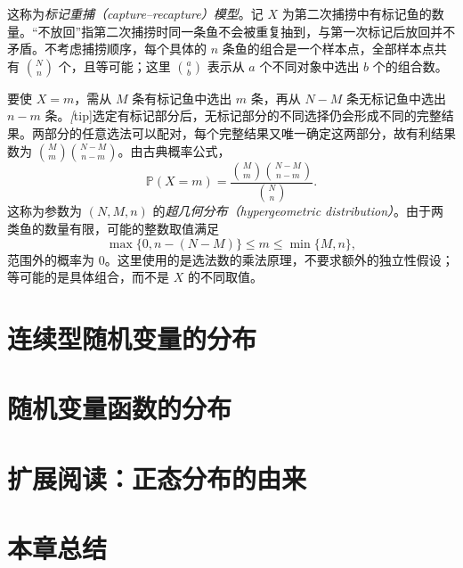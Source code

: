 \documentclass[UTF8,12pt,a4paper,fontset=fandol]{ctexbook}
\begin{document}
\begin{solve}
这称为\emph{标记重捕（capture--recapture）模型}。记 $X$ 为第二次捕捞中有标记鱼的数量。“不放回”指第二次捕捞时同一条鱼不会被重复抽到，与第一次标记后放回并不矛盾。不考虑捕捞顺序，每个具体的 $n$ 条鱼的组合是一个样本点，全部样本点共有 $\binom Nn$ 个，且等可能；这里 $\binom ab$ 表示从 $a$ 个不同对象中选出 $b$ 个的组合数。

要使 $X=m$，需从 $M$ 条有标记鱼中选出 $m$ 条，再从 $N-M$ 条无标记鱼中选出 $n-m$ 条。\emph[tip]{选定有标记部分后，无标记部分的不同选择仍会形成不同的完整结果。}两部分的任意选法可以配对，每个完整结果又唯一确定这两部分，故有利结果数为 $\binom Mm\binom{N-M}{n-m}$。由古典概率公式，
\begin{equation}
  \mathbb P(X=m)=\frac{\binom Mm\binom{N-M}{n-m}}{\binom Nn}.
  \label{eq:study-hypergeometric-mass}
\end{equation}
这称为参数为 $(N,M,n)$ 的\emph{超几何分布（hypergeometric distribution）}。由于两类鱼的数量有限，可能的整数取值满足
\begin{equation}
  \max\{0,n-(N-M)\}\le m\le\min\{M,n\},
  \label{eq:study-hypergeometric-support}
\end{equation}
范围外的概率为 $0$。这里使用的是选法数的乘法原理，不要求额外的独立性假设；等可能的是具体组合，而不是 $X$ 的不同取值。
\end{solve}

\section{连续型随机变量的分布}
\label{sec:study-continuous-distributions}

\section{随机变量函数的分布}
\label{sec:study-transformed-distributions}

\section{扩展阅读：正态分布的由来}
\label{sec:study-normal-origin}

\section*{本章总结}
\end{document}
